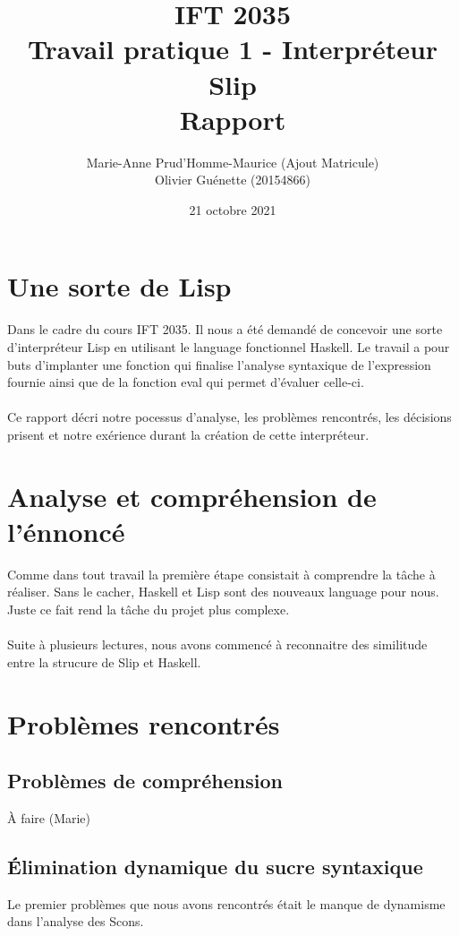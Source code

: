 \documentclass[12pt, letterpaper]{article}
\title{IFT 2035 \\ Travail pratique 1 - Interpréteur Slip \\ Rapport }
\author{ Marie-Anne Prud'Homme-Maurice (Ajout Matricule) 
\\ Olivier Guénette (20154866)}
\date{21 octobre 2021}
\begin{document}
\maketitle

\section*{Une sorte de Lisp}

Dans le cadre du cours IFT 2035. Il nous a été demandé de concevoir une sorte
d'interpréteur Lisp en utilisant le language fonctionnel Haskell. Le travail
a pour buts d'implanter une fonction qui finalise l'analyse syntaxique de
l'expression fournie ainsi que de la fonction eval qui permet d'évaluer
celle-ci.
\\
\\
Ce rapport décri notre pocessus d'analyse, les problèmes rencontrés,
les décisions prisent et notre exérience durant la création de
cette interpréteur.

\section*{Analyse et compréhension de l'énnoncé}

Comme dans tout travail la première étape consistait à comprendre la tâche à
réaliser.  Sans le cacher, Haskell et Lisp sont des nouveaux language pour nous.
Juste ce fait rend la tâche du projet plus complexe.
\\
\\
Suite à plusieurs lectures, nous avons commencé à reconnaitre des similitude
entre la strucure de Slip et Haskell.

\section*{Problèmes rencontrés}

\subsection*{Problèmes de compréhension}

À faire (Marie)

\subsection*{Élimination dynamique du sucre syntaxique}
Le premier problèmes que nous avons rencontrés était le manque de dynamisme
dans l'analyse des Scons.
\end{document}
